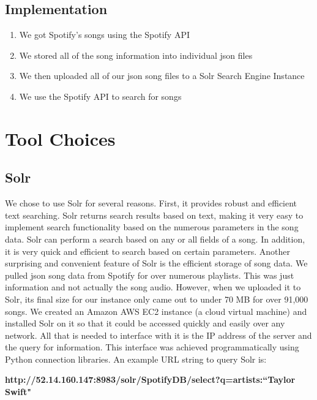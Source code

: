 \documentclass [letter,12pt] {article}
\begin{document}
    \subsection{Implementation}
        \begin{enumerate}
            \item We got Spotify’s songs using the Spotify API
            \item We stored all of the song information into 
                individual json files
            \item We then uploaded all of our json song files to a 
                Solr Search Engine Instance
            \item We use the Spotify API to search for songs 
        \end{enumerate}
        
\section{Tool Choices}
    \subsection{Solr}
        We chose to use Solr for several reasons. First, it provides robust and efficient text searching. Solr returns search results based on text, making it very easy to implement search functionality based on the numerous parameters in the song data. Solr can perform a search based on any or all fields of a song. In addition, it is very quick and efficient to search based on certain parameters. Another surprising and convenient feature of Solr is the efficient storage of song data. We pulled json song data from Spotify for over numerous playlists. This was just information and not actually the song audio. However, when we uploaded it to Solr, its final size for our instance only came out to under 70 MB for over 91,000 songs. We created an Amazon AWS EC2 instance (a cloud virtual machine) and installed Solr on it so that it could be accessed quickly and easily over any network. All that is needed to interface with it is the IP address of the server and the query for information. This interface was achieved programmatically using Python connection libraries. An example URL string to query Solr is:

        \begin{center}
            \textbf{http://52.14.160.147:8983/solr/SpotifyDB/select?q=artists:``Taylor Swift"}
        \end{center}
        
\end{document}
